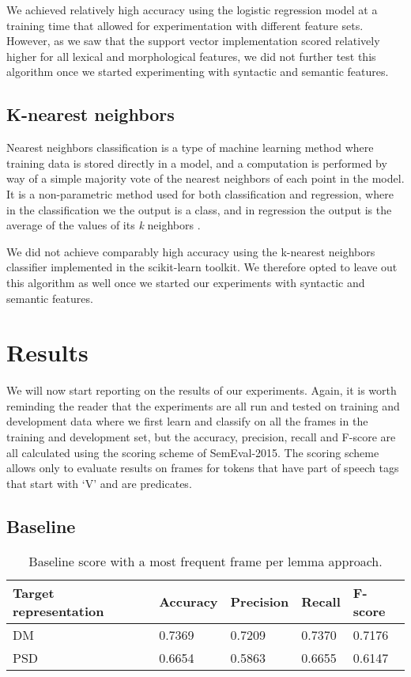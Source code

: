 We achieved relatively high accuracy using the logistic regression model at a training time that allowed for experimentation with different feature sets. However, as we saw that the support vector implementation scored relatively higher for all lexical and morphological features, we did not further test this algorithm once we started experimenting with syntactic and semantic features.

\subsection{K-nearest neighbors}

Nearest neighbors classification is a type of machine learning method where training data is stored directly in a model, and a computation is performed by way of a simple majority vote of the nearest neighbors of each point in the model. It is a non-parametric method used for both classification and regression, where in the classification we the output is a class, and in regression the output is the average of the values of its \textit{k} neighbors \cite{Altman:92}.

We did not achieve comparably high accuracy using the k-nearest neighbors classifier implemented in the scikit-learn toolkit. We therefore opted to leave out this algorithm as well once we started our experiments with syntactic and semantic features.

\section{Results}
\label{results}

We will now start reporting on the results of our experiments. Again, it is worth reminding the reader that the experiments are all run and tested on training and development data where we first learn and classify on all the frames in the training and development set, but the accuracy, precision, recall and F-score are all calculated using the scoring scheme of SemEval-2015. The scoring scheme allows only to evaluate results on frames for tokens that have part of speech tags that start with `V' and are predicates. 

\subsection{Baseline}

\begin{table}
    \centering
    \smaller[0.2]
    \begin{tabular}{@{}lllll@{}}
        \toprule
        \textbf{Target representation} & \textbf{Accuracy} & \textbf{Precision} & \textbf{Recall} & \textbf{F-score} \\
        \midrule
        DM & 0.7369 & 0.7209 & 0.7370 & 0.7176\\ 
        PSD & 0.6654 & 0.5863 & 0.6655 & 0.6147\\
        \bottomrule
    \end{tabular}
    \caption{Baseline score with a most frequent frame per lemma approach.}
    \label{table:baseline}
\end{table}

